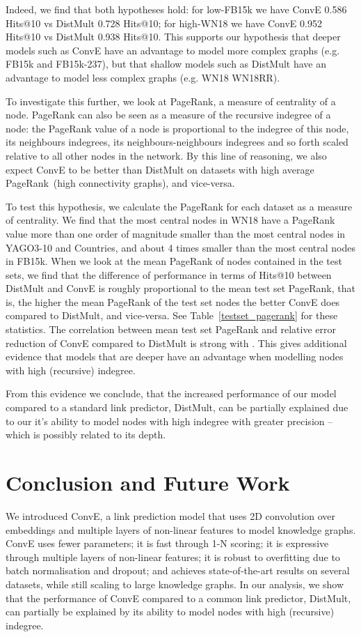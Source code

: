 \documentclass[letterpaper]{article}
\begin{document}
Indeed, we find that both hypotheses hold: for low-FB15k we have ConvE 0.586 Hits@10 vs DistMult 0.728 Hits@10; for high-WN18 we have ConvE 0.952 Hits@10 vs DistMult 0.938 Hits@10. This supports our hypothesis that deeper models such as ConvE have an advantage to model more complex graphs (e.g. FB15k and FB15k-237), but that shallow models such as DistMult have an advantage to model less complex graphs (e.g. WN18 WN18RR).


To investigate this further, we look at PageRank, a measure of centrality of a node. PageRank can also be seen as a measure of the recursive indegree of a node: the PageRank value of a node is proportional to the indegree of this node, its neighbours indegrees, its neighbours-neighbours indegrees and so forth scaled relative to all other nodes in the network. 
By this line of reasoning, we also expect ConvE to be better than DistMult on datasets with high average PageRank~(high connectivity graphs), and vice-versa.


To test this hypothesis, we calculate the PageRank for each dataset as a measure of centrality. We find that the most central nodes in WN18 have a PageRank value more than one order of magnitude smaller than the most central nodes in YAGO3-10 and Countries, and about 4 times smaller than the most central nodes in FB15k. When we look at the mean PageRank of nodes contained in the test sets, we find that the difference of performance in terms of Hits@10 between DistMult and ConvE is roughly proportional to the mean test set PageRank, that is, the higher the mean PageRank of the test set nodes the better ConvE does compared to DistMult, and vice-versa. See Table~\ref{testset_pagerank} for these statistics. The correlation between mean test set PageRank and relative error reduction of ConvE compared to DistMult is strong with . This gives additional evidence that models that are deeper have an advantage when modelling nodes with high (recursive) indegree.

From this evidence we conclude, that the increased performance of our model compared to a standard link predictor, DistMult, can be partially explained due to our it's ability to model nodes with high indegree with greater precision -- which is possibly related to its depth. 

\section{Conclusion and Future Work}

We introduced ConvE, a link prediction model that uses 2D convolution over embeddings and multiple layers of non-linear features to model knowledge graphs.
ConvE uses fewer parameters; it is fast through 1-N scoring; it is expressive through multiple layers of non-linear features; it is robust to overfitting due to batch normalisation and dropout; and achieves state-of-the-art results on several datasets, while still scaling to large knowledge graphs. 
In our analysis, we show that the performance of ConvE compared to a common link predictor, DistMult, can partially be explained by its ability to model nodes with high (recursive) indegree.
\end{document}
